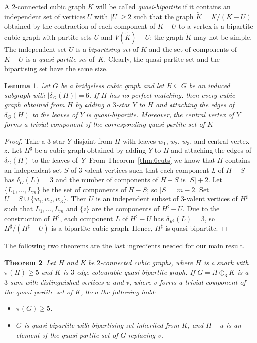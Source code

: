 \documentclass[a4paper]{amsart}
\theoremstyle{plain}
\newtheorem{theorem}{Theorem}[section]
\newtheorem{lemma}[theorem]{Lemma}
\theoremstyle{definition}
\begin{document}
A $2$-connected cubic graph $K$ will be called
\emph{quasi-bipartite} if it contains an independent set of
vertices $U$ with $|U|\ge 2$ such that the graph $\tilde
K=K/(K-U)$ obtained by the contraction of each component of
$K-U$ to a vertex is a bipartite cubic graph with partite sets
$U$ and $V(\tilde K)-U$; the graph $\tilde K$ may not be
simple. The independent set $U$ is a \emph{bipartising set} of
$K$ and the set of components of $K-U$ is a \emph{quasi-partite
set} of~$K$. Clearly, the quasi-partite set and the bipartising
set have the same size.

\begin{lemma}\label{lem:claw}
Let $G$ be a bridgeless cubic graph and let $H\subseteq G$ be
an induced subgraph with $|\delta_G(H)|=6$. If $H$ has no
perfect matching, then every cubic graph obtained from $H$ by
adding a $3$-star $Y$ to $H$ and attaching the edges of
$\delta_G(H)$ to the leaves of $Y$ is quasi-bipartite.
Moreover, the central vertex of $Y$ forms a trivial component
of the corresponding quasi-partite set of $K$.
\end{lemma}

\begin{proof}
Take a $3$-star $Y$ disjoint from $H$ with leaves $w_1$, $w_2$,
$w_3$, and central vertex $z$. Let $H^{\sharp}$ be a cubic
graph obtained by adding $Y$ to $H$ and attaching the edges of
$\delta_G(H)$ to the leaves of~$Y$. From
Theorem~\ref{thm:6cuts} we know that $H$ contains an
independent set $S$ of $3$-valent vertices such that each
component $L$ of $H-S$ has $\delta_G(L)=3$ and the number of
components of $H-S$ is $|S|+2$. Let $\{L_1,\ldots,L_m\}$ be the
set of components of $H-S$; so $|S|=m-2$. Set
$U=S\cup\{w_1,w_2,w_3\}$. Then $U$ is an independent subset of
$3$-valent vertices of $H^\sharp$ such that $L_1,\ldots,L_m$
and $\{z\}$ are the components of $H^{\sharp}-U$. Due to the
construction of $H^\sharp$, each component $L$ of $H^{\sharp}
-U$ has $\delta_{H^\sharp}(L)=3$, so
$H^{\sharp}/(H^{\sharp}-U)$ is a bipartite cubic graph. Hence,
$H^{\sharp}$ is quasi-bipartite.
\end{proof}

The following two theorems are the last ingredients needed for
our main result.

\begin{theorem}\label{thm:3-sumpmi5}
Let $H$ and $K$ be $2$-connected cubic graphs, where $H$ is a
snark with $\pi(H)\ge 5$ and $K$ is $3$-edge-colourable
quasi-bipartite graph. If $G=H\oplus_3 K$ is a $3$-sum with
distinguished vertices $u$ and $v$, where
$v$ forms a trivial component of the quasi-partite set of $K$,
then the following hold:
\begin{itemize}
\item[{\rm (i)}] $\pi(G)\ge 5$.

\item[{\rm (ii)}] $G$ is quasi-bipartite with bipartising
    set inherited from $K$, and $H-u$ is an element of the
    quasi-partite set of $G$ replacing $v$.
\end{itemize}
\end{theorem}
\end{document}
